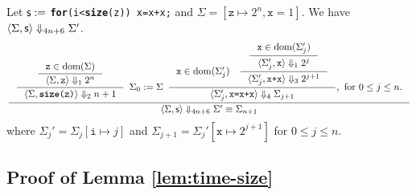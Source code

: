 \documentclass[runningheads]{llncs}
\begin{document}
\begin{example}[Loop]
\label{exp:loop_cost}
Let $\s:=\;$\texttt{\textbf{for}(i<\textbf{size}(z)) x=x+x;} and $\Sigma = [\texttt{z}\mapsto 2^n,\texttt{x}=1]$.
We have $\cost{\Sigma}{\s}{\Sigma'}{4n+6}$.
{\fontsize{7pt}{6pt}\selectfont
$$
\inference
{
    {
    \inference
    {
        {
        \inference{\texttt{z}\in\dom(\Sigma)}
        {\cost{\Sigma}{\texttt{z}}{2^n}{1}}
        }
    }
    {
        \cost{\Sigma}{\texttt{\textbf{size}(z)}}{n+1}{2}
    }
    }
    \enspace
    \Sigma_0:=\Sigma
    \enspace
    {
    \inference
    {
        \texttt{x}\in\dom(\Sigma_j')
        \quad
        {
        \inference
        {
            {
            \inference
            {
                \texttt{x}\in\dom(\Sigma_j')
            }
            {
                \cost{\Sigma_j'}{\texttt{x}}{2^j}{1}
            }
            }
        }
        {
            \cost{\Sigma_j'}{\texttt{x+x}}{2^{j+1}}{3}
        }
        }
    }
    {
        \cost{\Sigma_j'}{\texttt{x=x+x}}{\Sigma_{j+1}}{4}
    }
    }
    , \text{ for }0\le j\le n.
}
{\cost{\Sigma}{\s}{\Sigma'\equiv\Sigma_{n+1}}{4n+6}}
$$
}
where $\Sigma_j'=\Sigma_j[\texttt{i}\mapsto j]$ and $\Sigma_{j+1}=\Sigma_j'[\texttt{x}\mapsto 2^{j+1}]$ for $0\le j\le n$.
\end{example}

\subsection{Proof of Lemma \ref{lem:time-size}}\label{App_proof_of_prop:time-size}
\end{document}
